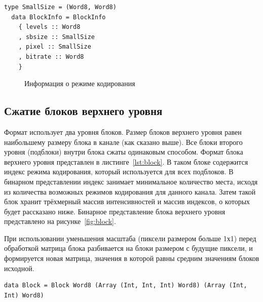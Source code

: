 \documentclass[a4paper,12pt]{article}
\numberwithin{equation}{section}
\begin{document}
\begin{lstlisting}[float=t,caption={Структура информации о кодировании блока},label=lst:blockinfo]
  type SmallSize = (Word8, Word8)
  data BlockInfo = BlockInfo
    { levels :: Word8
    , sbsize :: SmallSize
    , pixel :: SmallSize
    , bitrate :: Word8
    }
\end{lstlisting}

\begin{figure}[t]
  \centering
  
  \caption{Информация о режиме кодирования}
  \label{fig:blockinfo}
\end{figure}

\subsection{Сжатие блоков верхнего уровня}

Формат использует два уровня блоков. Размер блоков верхнего уровня равен
наибольшему размеру блока в канале (как сказано выше). Все блоки второго уровня
(подблоки) внутри блока сжаты одинаковым способом. Формат блока верхнего уровня
представлен в листинге~\ref{lst:block}. В таком блоке содержится индекс режима
кодирования, который используется для всех подблоков. В бинарном представлении
индекс занимает минимальное количество места, исходя из количества возможных
режимов кодирования для данного канала. Затем такой блок хранит трёхмерный
массив интенсивностей и массив индексов, о которых будет рассказано
ниже. Бинарное представление блока верхнего уровня представлено на
рисунке~\ref{fig:block}.

При использовании уменьшения масштаба (пиксели размером больше 1х1) перед
обработкой матрица блока разбивается на блоки размером с будущие пиксели, и
формируется новая матрица, значения в которой равны средним значениям блоков
исходной.

\begin{lstlisting}[float=t,caption={Структура блока верхнего уровня},label=lst:block]
  data Block = Block Word8 (Array (Int, Int, Int) Word8) (Array (Int, Int) Word8)
\end{lstlisting}
\end{document}
